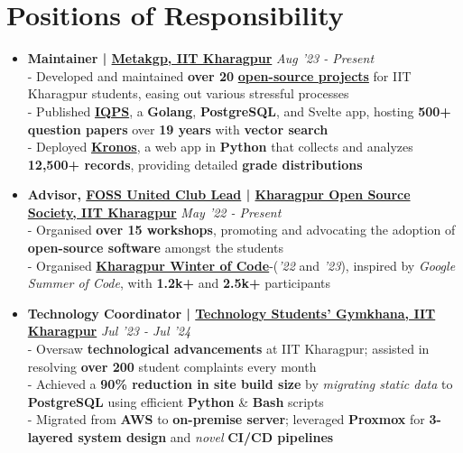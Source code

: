 \documentclass[a4paper,10pt]{extarticle} %
\begin{document}
\section{\textcolor{primary}{Positions of Responsibility}}
\vspace{+0.2cm}

\begin{itemize}[leftmargin=0.55cm, rightmargin=0.2cm, label={\Large\textbullet}]

\item \textbf{Maintainer | \href{https://metakgp.org/}{Metakgp, IIT Kharagpur}} \hfill{\textit{Aug '23 - Present}}\\
- Developed and maintained \textbf{over 20} \textbf{\href{https://github.com/metakgp}{open-source projects}} for IIT Kharagpur students, easing out various stressful processes \\
- Published \href{https://qp.metakgp.org}{\textbf{IQPS}}, a \textbf{Golang}, \textbf{PostgreSQL}, and Svelte app, hosting \textbf{500+ question papers} over \textbf{19 years} with \textbf{vector search} \\
- Deployed \href{https://kronos.streamlit.app}{\textbf{Kronos}}, a web app in \textbf{Python} that collects and analyzes \textbf{12,500+ records}, providing detailed \textbf{grade distributions}

\item \textbf{Advisor, \href{https://fossunited.org/clubs}{\textbf{FOSS United Club Lead}} | \href{https://kossiitkgp.org}{Kharagpur Open Source Society, IIT Kharagpur}} \hfill{\textit{May '22 - Present}}\\
- Organised \textbf{over 15 workshops}, promoting and advocating the adoption of \textbf{open-source software} amongst the students \\
- Organised \textbf{\href{https://kwoc.kossiitkgp.org/}{Kharagpur Winter of Code}}-(\textit{'22} and \textit{'23}), inspired by \textit{Google Summer of Code}, with \textbf{1.2k+} and \textbf{2.5k+} participants

\item \textbf{Technology Coordinator | \href{https://gymkhana.iitkgp.ac.in/}{Technology Students' Gymkhana, IIT Kharagpur}} \hfill{\textit{Jul '23 - Jul '24}}\\
- Oversaw \textbf{technological advancements} at IIT Kharagpur;  assisted in resolving \textbf{over 200} student complaints every month \\
- Achieved a \textbf{90\% reduction in site build size} by \textit{migrating static data} to \textbf{PostgreSQL} using efficient \textbf{Python} \& \textbf{Bash} scripts \\
- Migrated from \textbf{AWS} to \textbf{on-premise server}; leveraged \textbf{Proxmox} for \textbf{3-layered system design} and \textit{novel} \textbf{CI/CD pipelines}

\end{itemize}
\end{document}
